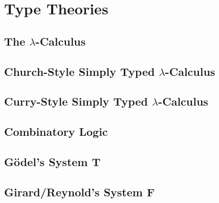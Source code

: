 \documentclass[phd,appendix,dedicationpage,ackpage,epigraphpage]{uithesis}
\begin{document}



\appendix

\chapter{Type Theories}
\label{chap:type_theories}
\section{The $\lambda$-Calculus}
\label{sec:the_lambda-calculus}
\Lamall{}

\newpage
\section{Church-Style Simply Typed $\lambda$-Calculus}
\label{sec:church_style_simply_typed_lambda-calculus}
\CHSTLCall{}

\newpage
\section{Curry-Style Simply Typed $\lambda$-Calculus}
\label{sec:curry_style_simply_typed_lambda-calculus}
\CSTLCall{}

\newpage
\section{Combinatory Logic}
\label{sec:combinatory_logic}
\Comball{}

\newpage
\section{G\"odel's System T}
\label{sec:godels_system_t}
\Tall{}

\newpage
\section{Girard/Reynold's System F}
\label{sec:girard-reynolds_system_f}
\Fall{}

\newpage
\end{document}
